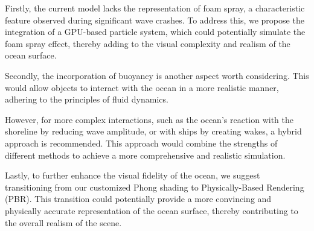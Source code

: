 Firstly, the current model lacks the representation of foam spray, a characteristic feature observed during significant wave crashes. To address this, we propose the integration of a GPU-based particle system, which could potentially simulate the foam spray effect, thereby adding to the visual complexity and realism of the ocean surface.

Secondly, the incorporation of buoyancy is another aspect worth considering. This would allow objects to interact with the ocean in a more realistic manner, adhering to the principles of fluid dynamics.

However, for more complex interactions, such as the ocean’s reaction with the shoreline by reducing wave amplitude, or with ships by creating wakes, a hybrid approach is recommended. This approach would combine the strengths of different methods to achieve a more comprehensive and realistic simulation.

Lastly, to further enhance the visual fidelity of the ocean, we suggest transitioning from our customized Phong shading to Physically-Based Rendering (PBR). This transition could potentially provide a more convincing and physically accurate representation of the ocean surface, thereby contributing to the overall realism of the scene.
